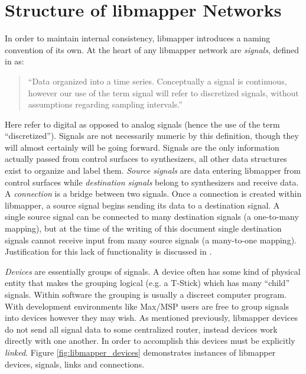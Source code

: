 	\section{Structure of libmapper Networks} %
	\label{sec:structure_of_libmapper_networks}

In order to maintain internal consistency, libmapper introduces a naming convention of its own. At the heart of any libmapper network are \emph{signals}, defined in  as:
\begin{quote}
``Data organized into a time series. Conceptually a signal is continuous, however our use of the term signal will refer to discretized signals, without assumptions regarding sampling intervals.''
\end{quote}
Here  refer to digital as opposed to analog signals (hence the use of the term ``discretized''). Signals are not necessarily numeric by this definition, though they will almost certainly will be going forward. Signals are the only information actually passed from control surfaces to synthesizers, all other data structures exist to organize and label them. \emph{Source signals} are data entering libmapper from control surfaces while \emph{destination signals} belong to synthesizers and receive data. A \emph{connection} is a bridge between two signals. Once a connection is created within libmapper, a source signal begins sending its data to a destination signal. A single source signal can be connected to many destination signals (a one-to-many mapping), but at the time of the writing of this document single destination signals cannot receive input from many source signals (a many-to-one mapping). Justification for this lack of functionality is discussed in .

\emph{Devices} are essentially groups of signals. A device often has some kind of physical entity that makes the grouping logical (e.g. a T-Stick) which has many ``child'' signals. Within software the grouping is usually a discreet computer program. With development environments like Max/MSP users are free to group signals into devices however they may wish. As mentioned previously, libmapper devices do not send all signal data to some centralized router, instead devices work directly with one another. In order to accomplish this devices must be explicitly \emph{linked}. Figure \ref{fig:libmapper_devices} demonstrates instances of libmapper devices, signals, links and connections.
 
